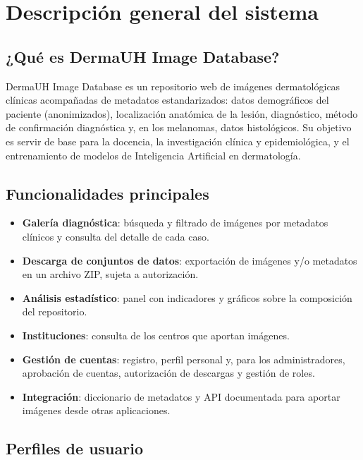 \documentclass[11pt,a4paper]{article}
\newcommand{\seccion}[1]{\clearpage\section{#1}}
\begin{document}
\seccion{Descripción general del sistema}
\label{sec:descripcion}

\subsection{¿Qué es DermaUH Image Database?}

DermaUH Image Database es un repositorio web de imágenes dermatológicas clínicas
acompañadas de metadatos estandarizados: datos demográficos del paciente
(anonimizados), localización anatómica de la lesión, diagnóstico, método de
confirmación diagnóstica y, en los melanomas, datos histológicos. Su objetivo es
servir de base para la docencia, la investigación clínica y epidemiológica, y el
entrenamiento de modelos de Inteligencia Artificial en dermatología.

\subsection{Funcionalidades principales}

\begin{itemize}
  \item \textbf{Galería diagnóstica}: búsqueda y filtrado de imágenes por
  metadatos clínicos y consulta del detalle de cada caso.
  \item \textbf{Descarga de conjuntos de datos}: exportación de imágenes y/o
  metadatos en un archivo ZIP, sujeta a autorización.
  \item \textbf{Análisis estadístico}: panel con indicadores y gráficos sobre la
  composición del repositorio.
  \item \textbf{Instituciones}: consulta de los centros que aportan imágenes.
  \item \textbf{Gestión de cuentas}: registro, perfil personal y, para los
  administradores, aprobación de cuentas, autorización de descargas y
  gestión de roles.
  \item \textbf{Integración}: diccionario de metadatos y API documentada para
  aportar imágenes desde otras aplicaciones.
\end{itemize}

\subsection{Perfiles de usuario}
\label{sec:roles}
\end{document}
